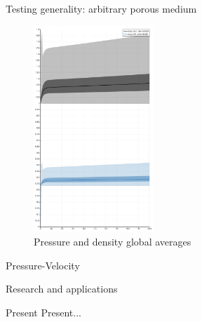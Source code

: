 \documentclass{beamer}
\begin{document}
	\begin{frame}{Testing generality: arbitrary porous medium}
		
		\begin{figure}
			\centering
			\includegraphics[width=0.4\textwidth]{pics/pmGlobal.png}
			\caption{Pressure and density global averages}   
		\end{figure}
	\end{frame}
	
	\begin{frame}{Pressure-Velocity}
		
	\end{frame}
		
	\begin{frame}{Research and applications}
		
	\end{frame}
	
	
	\begin{frame}{Present}
		Present...
	\end{frame}
	
\end{document}
